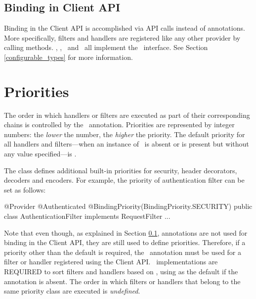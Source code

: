 \subsection{Binding in Client API}
\label{binding_in_client_api}

Binding in the Client API is accomplished via API calls instead of annotations. More specifically, filters and handlers are registered like any other provider by calling  methods. \Client, \ClientConfiguration, \Link\ and \Invocation\ all implement the \Configurable\ interface. See Section \ref{configurable_types} for more information.

\section{Priorities}
\label{priorities}

The order in which handlers or filters are executed as part of their corresponding chains is controlled by the \BindingPriority\ annotation.
Priorities are represented by integer numbers: the \emph{lower} the number, the \emph{higher} the priority. The default priority for all handlers and filters---when an instance of \BindingPriority\ is absent or is present but without any value specified---is . 

The  class defines additional built-in priorities for security, header decorators, decoders and encoders. For example, the priority of authentication filter can be set as follows:

\begin{listing}{1}
@Provider
@Authenticated
@BindingPriority(BindingPriority.SECURITY)
public class AuthenticationFilter implements RequestFilter {
    ...
}
\end{listing}

Note that even though, as explained in Section \ref{binding_in_client_api}, annotations are not used for binding in the Client API, they are still used to define priorities. Therefore, if a priority other than the default is required, the \BindingPriority\ annotation must be used for a filter or handler registered using the Client API. \jaxrs\ implementations are REQUIRED to sort filters and handlers based on , using  as the default if the annotation is absent. The order in which filters or handlers that belong to the same priority class are executed is \emph{undefined}.



